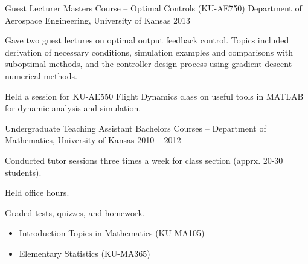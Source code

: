 \begin{cventries}
\cvprojwideentry
  	{Guest Lecturer} %
  	{Masters Course -- Optimal Controls (KU-AE750)} %
    {Department of Aerospace Engineering, University of Kansas} %
    {2013} %
    {
    	  \begin{cvitems} %
        \item Gave two guest lectures on optimal output feedback control. Topics included derivation of necessary conditions, simulation examples and comparisons with suboptimal methods, and the controller design process using gradient descent numerical methods.
		\item Held a session for KU-AE550 Flight Dynamics class on useful tools in MATLAB for dynamic analysis and simulation.
      \end{cvitems}
    } %
    {} %
    {\showprojectdescriptions}
    {}

\cvprojwideentry
  	{Undergraduate Teaching Assistant} %
  	{Bachelors Courses --} %
    {Department of Mathematics, University of Kansas} %
    {2010 – 2012} %
    {
      \begin{cvitems} %
        \item Conducted tutor sessions three times a week for class section (apprx. 20-30 students).
		\item Held office hours.
		\item Graded tests, quizzes, and homework.
      \end{cvitems}
    } %
    {} %
    {\showprojectdescriptions}
    {
	  \vspace{-4.0mm}
      \begin{justify}
      \begin{itemize}[leftmargin=2ex, nosep, noitemsep, label={}]
        \setlength{\parskip}{0pt}
     	\item Introduction Topics in Mathematics (KU-MA105)
     	\item Elementary Statistics (KU-MA365)
      \end{itemize}
      \end{justify}
      \vspace{-4.0mm}
    }
\vspace*{-9pt}

\end{cventries}
